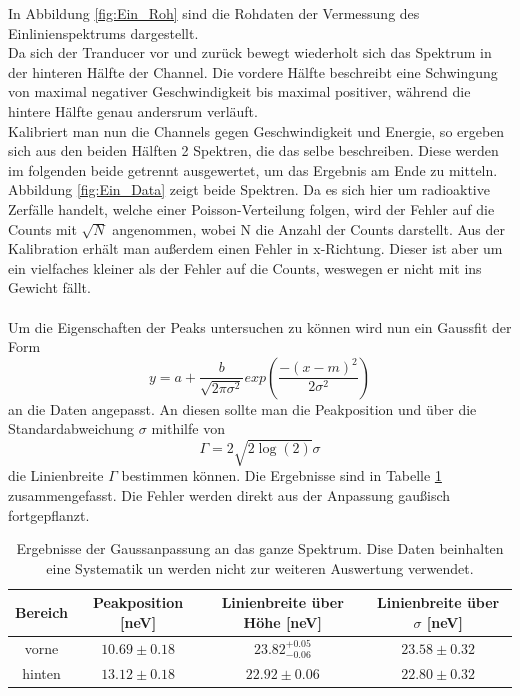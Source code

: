 \documentclass[12pt,a4paper]{article}
\begin{document}
In Abbildung \ref{fig:Ein_Roh} sind die Rohdaten der Vermessung des Einlinienspektrums dargestellt.\\
Da sich der Tranducer vor und zurück bewegt wiederholt sich das Spektrum in der hinteren Hälfte der Channel. Die vordere Hälfte beschreibt eine Schwingung von maximal negativer Geschwindigkeit bis maximal positiver, während die hintere Hälfte genau andersrum verläuft.\\
Kalibriert man nun die Channels gegen Geschwindigkeit und Energie, so ergeben sich aus den beiden Hälften 2 Spektren, die das selbe beschreiben. Diese werden im folgenden beide getrennt ausgewertet, um das Ergebnis am Ende zu mitteln.\\
Abbildung \ref{fig:Ein_Data} zeigt beide Spektren. Da es sich hier um radioaktive Zerfälle handelt, welche einer Poisson-Verteilung folgen, wird der Fehler auf die Counts mit $\sqrt{N}$ angenommen, wobei N die Anzahl der Counts darstellt. Aus der Kalibration erhält man außerdem einen Fehler in x-Richtung. Dieser ist aber um ein vielfaches kleiner als der Fehler auf die Counts, weswegen er nicht mit ins Gewicht fällt.\\
\\
Um die Eigenschaften der Peaks untersuchen zu können wird nun ein Gaussfit der Form
\begin{equation}
y = a + \dfrac{b}{\sqrt{2\pi\sigma^2}}exp\left(\dfrac{-(x-m)^2}{2\sigma^2}\right)
\end{equation}
an die Daten angepasst. An diesen sollte man die Peakposition und über die Standardabweichung $\sigma$ mithilfe von 
\begin{equation}
\Gamma = 2\sqrt{2\log(2)}\sigma
\label{eq_ein_gamma}
\end{equation}
die Linienbreite $\Gamma$  bestimmen können. Die Ergebnisse sind in Tabelle \ref{tab:Ein_gauss} zusammengefasst. Die Fehler werden direkt aus der Anpassung gaußisch fortgepflanzt.\\

\begin{table}
\centering
\begin{tabular}{|c|c|c|c|}
\hline 
Bereich & Peakposition [neV] & Linienbreite über Höhe [neV] & Linienbreite über $\sigma$ [neV]\\ 
\hline 
vorne & $10.69\pm 0.18$ & $23.82^{+0.05}_{-0.06}$ & $23.58\pm 0.32$ \\ 
\hline 
hinten & $13.12\pm 0.18$ & $22.92\pm 0.06$ & $22.80\pm 0.32$ \\ 
\hline 
\end{tabular}
\caption{Ergebnisse der Gaussanpassung an das ganze Spektrum. Dise Daten beinhalten eine Systematik un werden nicht zur weiteren Auswertung verwendet.}
\label{tab:Ein_gauss}
\end{table}
\end{document}
